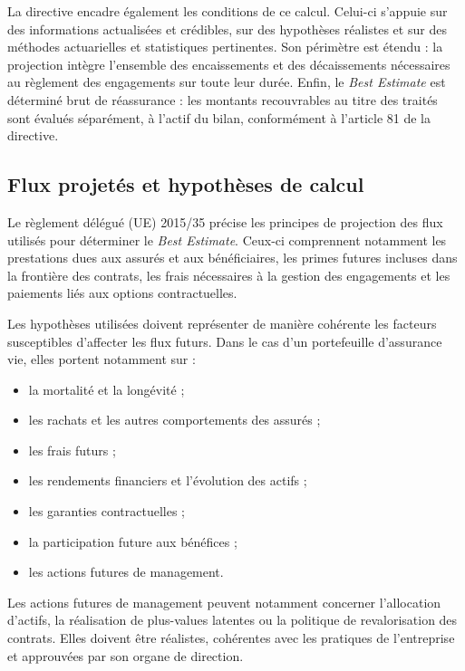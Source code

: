 La directive encadre également les conditions de ce calcul. Celui-ci s'appuie
sur des informations actualisées et crédibles, sur des hypothèses réalistes et
sur des méthodes actuarielles et statistiques pertinentes. Son périmètre est
étendu : la projection intègre l'ensemble des encaissements et des
décaissements nécessaires au règlement des engagements sur toute leur durée.
Enfin, le \textit{Best Estimate} est déterminé brut de réassurance : les
montants recouvrables au titre des traités sont évalués séparément, à l'actif
du bilan, conformément à l'article 81 de la directive.

\subsection{Flux projetés et hypothèses de calcul}

Le règlement délégué (UE) 2015/35 précise les principes de projection des flux
utilisés pour déterminer le \textit{Best Estimate}. Ceux-ci comprennent notamment les prestations dues
aux assurés et aux bénéficiaires, les primes futures incluses dans la frontière
des contrats, les frais nécessaires à la gestion des engagements et les
paiements liés aux options contractuelles.

Les hypothèses utilisées doivent représenter de manière cohérente les facteurs
susceptibles d'affecter les flux futurs. Dans le cas d'un portefeuille
d'assurance vie, elles portent notamment sur :

\begin{itemize}[label=\textemdash, nosep, leftmargin=2.5em]
    \item la mortalité et la longévité ;
    \item les rachats et les autres comportements des assurés ;
    \item les frais futurs ;
    \item les rendements financiers et l'évolution des actifs ;
    \item les garanties contractuelles ;
    \item la participation future aux bénéfices ;
    \item les actions futures de management.
\end{itemize}

Les actions futures de management peuvent notamment concerner l'allocation 
d'actifs, la réalisation de plus-values latentes ou la politique de 
revalorisation des contrats. Elles doivent être réalistes, cohérentes 
avec les pratiques de l'entreprise et approuvées par son organe de direction.

